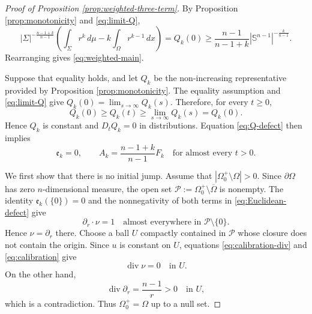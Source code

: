 \documentclass[10pt,a4paper]{amsart}
\numberwithin{equation}{section}
\newcommand{\Sn}{\mathbb S}
\newcommand{\Om}{\Omega}
\newcommand{\Sig}{\Sigma}
\newcommand{\diver}{\operatorname{div}}
\begin{document}
\begin{proof}[Proof of Proposition \ref{prop:weighted-three-term}]
By Proposition \ref{prop:monotonicity} and \eqref{eq:limit-Q},
\begin{equation*}
    |\Sig|^{-\frac{n-1+k}{n-1}}
    \left(\int_\Sig r^k\,d\mu-k\int_\Om r^{k-1}\,dx\right)
    =Q_k(0)
    \geq
    \frac{n-1}{n-1+k}|\Sn^{n-1}|^{-\frac{k}{n-1}}.
\end{equation*}
Rearranging gives \eqref{eq:weighted-main}.

Suppose that equality holds, and let $Q_k$ be the non-increasing
representative provided by Proposition \ref{prop:monotonicity}. The
equality assumption and \eqref{eq:limit-Q} give $Q_k(0)=\lim_{s\to\infty}Q_k(s)$.
Therefore, for every $t\geq0$,
\begin{equation*}
    Q_k(0)\geq Q_k(t)\geq
    \lim_{s\to\infty}Q_k(s)=Q_k(0).
\end{equation*}
Hence $Q_k$ is constant and $D_tQ_k=0$ in distributions. Equation \eqref{eq:Q-defect} then implies
\begin{equation}\label{eq:equality-defects-zero}
    \mathfrak e_k=0,
    \qquad
    A_k=\frac{n-1+k}{n-1} F_k
    \quad\text{for almost every }t>0.
\end{equation}

We first show that there is no initial jump.  Assume that $  |\Om_0^+\setminus\Om|>0$.  Since $\partial\Om$ has zero $n$-dimensional measure, the open set $ \mathcal P:=\Om_0^+\setminus\overline\Om$ is nonempty.  The identity $\mathfrak e_k(\{0\})=0$ and the nonnegativity of both terms in \eqref{eq:Euclidean-defect} give
\begin{equation*}
    \partial_r\cdot\nu=1
    \quad\text{almost everywhere in }\mathcal P\setminus\{0\}.
\end{equation*}
Hence $\nu=\partial_r$ there.  Choose a ball $U$ compactly contained in $\mathcal P$ whose closure does not contain the origin.  Since $u$ is constant on $U$, equations \eqref{eq:calibration-div} and \eqref{eq:calibration} give
\begin{equation*}
    \diver\nu=0
    \quad\text{in }U.
\end{equation*}
On the other hand,
\begin{equation*}
    \diver \partial_r=\frac{n-1}{r}>0
    \quad\text{in }U,
\end{equation*}
which is a contradiction.  Thus $\Om_0^+=\Om$ up to a null set.


\end{proof}
\end{document}
